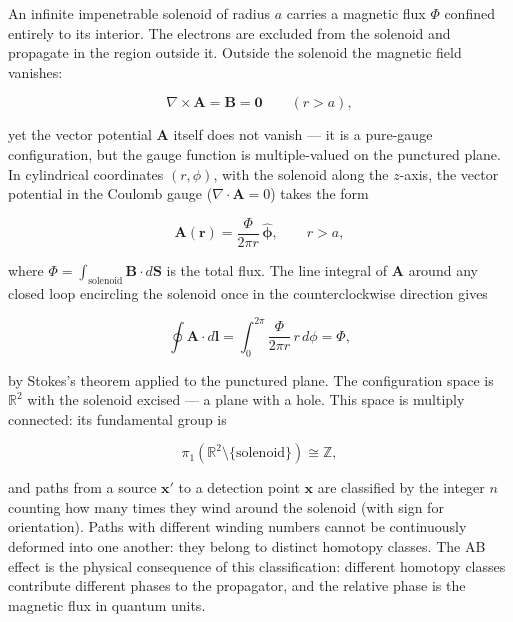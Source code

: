 An infinite impenetrable solenoid of radius $a$ carries a magnetic flux $\Phi$ confined entirely to its interior. The electrons are excluded from the solenoid and propagate in the region outside it. Outside the solenoid the magnetic field vanishes:
\begin{linenomath}
\begin{equation*}
\nabla\times\bm A = \bm B = \bm 0 \qquad (r > a),
\end{equation*}
\end{linenomath}
yet the vector potential $\bm A$ itself does not vanish --- it is a pure-gauge configuration, but the gauge function is multiple-valued on the punctured plane. In cylindrical coordinates $(r,\phi)$, with the solenoid along the $z$-axis, the vector potential in the Coulomb gauge ($\nabla\cdot\bm A = 0$) takes the form
\begin{linenomath}
\begin{equation*}
\bm A(\bm r) = \frac{\Phi}{2\pi r}\,\hat{\bm\phi}, \qquad r > a,
\end{equation*}
\end{linenomath}
where $\Phi = \int_{\text{solenoid}} \bm B\cdot d\bm S$ is the total flux. The line integral of $\bm A$ around any closed loop encircling the solenoid once in the counterclockwise direction gives
\begin{linenomath}
\begin{equation}
\oint \bm A\cdot d\bm l = \int_0^{2\pi} \frac{\Phi}{2\pi r}\,r\,d\phi = \Phi,
\end{equation}
\end{linenomath}
by Stokes's theorem applied to the punctured plane. The configuration space is $\mathbb{R}^2$ with the solenoid excised --- a plane with a hole. This space is multiply connected: its fundamental group is
\begin{linenomath}
\begin{equation}
\pi_1(\mathbb{R}^2\setminus\{\text{solenoid}\}) \cong \mathbb{Z},
\end{equation}
\end{linenomath}
and paths from a source $\bm x'$ to a detection point $\bm x$ are classified by the integer $n$ counting how many times they wind around the solenoid (with sign for orientation). Paths with different winding numbers cannot be continuously deformed into one another: they belong to distinct homotopy classes. The AB effect is the physical consequence of this classification: different homotopy classes contribute different phases to the propagator, and the relative phase is the magnetic flux in quantum units.

